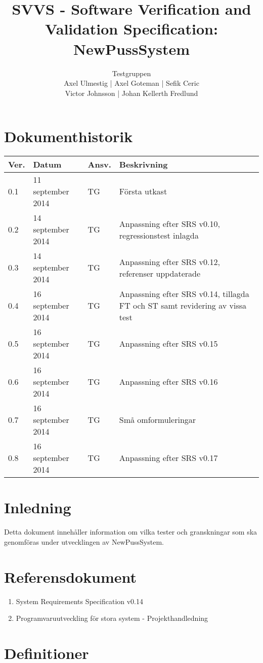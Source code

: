 \documentclass[a4paper]{article}
\title{SVVS - Software Verification and Validation Specification: NewPussSystem}
\author{Testgruppen \\ Axel Ulmestig | Axel Goteman | Sefik Ceric \\ Victor Johnsson | Johan Kellerth Fredlund}
\date{}
\begin{document}
\maketitle
\thispagestyle{fancy}
\tableofcontents
\newpage

\section*{Dokumenthistorik}

\begin{tabular}{ l l l l }
Ver. & Datum & Ansv. & Beskrivning \\\hline
0.1 & 11 september 2014 & TG & Första utkast \\
0.2 & 14 september 2014 & TG & Anpassning efter SRS v0.10, regressionstest inlagda \\
0.3 & 14 september 2014 & TG & Anpassning efter SRS v0.12, referenser uppdaterade\\
0.4 & 16 september 2014 & TG & Anpassning efter SRS v0.14, tillagda FT och ST samt revidering av vissa test\\
0.5 & 16 september 2014 & TG & Anpassning efter SRS v0.15\\
0.6 & 16 september 2014 & TG & Anpassning efter SRS v0.16\\
0.7 & 16 september 2014 & TG & Små omformuleringar \\
0.8 & 16 september 2014 & TG & Anpassning efter SRS v0.17\\

\end{tabular}
\section{Inledning}       

Detta dokument innehåller information om vilka tester och granskningar som ska genomföras under utvecklingen av NewPussSystem.

\section{Referensdokument}
\begin{enumerate}
\item System Requirements Specification v0.14
\item Programvaruutveckling för stora system - Projekthandledning
\end{enumerate}

\section{Definitioner}
\end{document}
